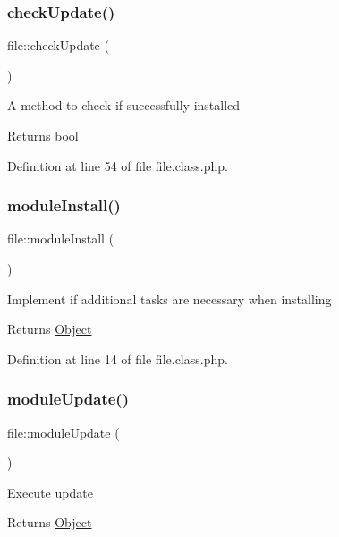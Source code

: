 \subsubsection{\texorpdfstring{check\+Update()}{checkUpdate()}}
{\footnotesize\ttfamily file\+::check\+Update (\begin{DoxyParamCaption}{ }\end{DoxyParamCaption})}

A method to check if successfully installed

\begin{DoxyReturn}{Returns}
bool 
\end{DoxyReturn}


Definition at line 54 of file file.\+class.\+php.

\hypertarget{classfile_a5e8c34a5d2187f2a332a88e112c90bdc}{}\label{classfile_a5e8c34a5d2187f2a332a88e112c90bdc} 
\subsubsection{\texorpdfstring{module\+Install()}{moduleInstall()}}
{\footnotesize\ttfamily file\+::module\+Install (\begin{DoxyParamCaption}{ }\end{DoxyParamCaption})}

Implement if additional tasks are necessary when installing

\begin{DoxyReturn}{Returns}
\hyperlink{classObject}{Object} 
\end{DoxyReturn}


Definition at line 14 of file file.\+class.\+php.

\hypertarget{classfile_a13a5d2858426d421327f744555fec4fb}{}\label{classfile_a13a5d2858426d421327f744555fec4fb} 
\subsubsection{\texorpdfstring{module\+Update()}{moduleUpdate()}}
{\footnotesize\ttfamily file\+::module\+Update (\begin{DoxyParamCaption}{ }\end{DoxyParamCaption})}

Execute update

\begin{DoxyReturn}{Returns}
\hyperlink{classObject}{Object} 
\end{DoxyReturn}


